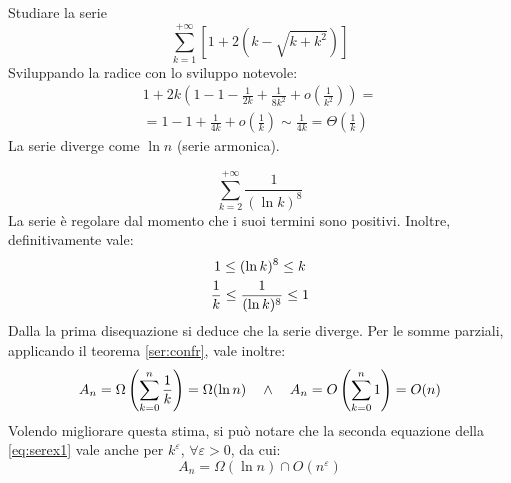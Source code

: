 \begin{examp}
	Studiare la serie
	\[
		\sum_{k=1}^{+\infty}[1+2(k-\sqrt{k+k^2})]
	\]
	Sviluppando la radice con lo sviluppo notevole:
	\begin{gather*}
		1+2k\left(1-1-\frac{1}{2k}+\frac{1}{8k^2}+o\left(\frac{1}{k^2}\right)\right)=\\
		=1-1+\frac{1}{4k}+o\left(\frac{1}{k}\right)\sim\frac{1}{4k}=\Theta\left(\frac{1}{k}\right)
	\end{gather*}
	La serie diverge come $\ln n$ (serie armonica).
\end{examp}

\begin{examp}
	\[
		\sum_{k=2}^{+\infty}\frac{1}{(\ln k)^8}
	\]
	La serie è regolare dal momento che i suoi termini sono positivi. Inoltre, definitivamente vale:
	\begin{gather}
		\label{eq:serex1}
		1\leq(\ln k)^8\leq k\\
		\frac{1}{k}\leq\frac{1}{(\ln k)^8}\leq 1\notag
	\end{gather}
	Dalla la prima disequazione si deduce che la serie diverge. Per le somme parziali, applicando il teorema \ref{ser:confr}, vale inoltre:
	\[
		A_n=\Omega\left(\sum_{k=0}^n \frac{1}{k}\right)=\Omega(\ln n) \quad\land\quad A_n=O\left(\sum_{k=0}^n 1\right)=O(n)\\
	\]
	Volendo migliorare questa stima, si può notare che la seconda equazione della \ref{eq:serex1} vale anche per $k^\varepsilon$, $\forall\varepsilon>0$, da cui:
	\[
		A_n=\Omega(\ln n)\cap O(n^\varepsilon)
	\]
\end{examp}


